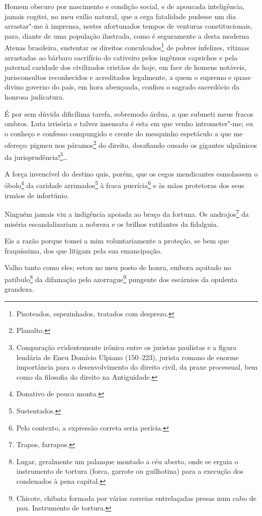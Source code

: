 Homem obscuro por nascimento e condição social, e de apoucada
inteligência, jamais cogitei, no meu exílio natural, que a cega
fatalidade pudesse um dia arrastar"-me à imprensa, nestes afortunados
tempos de venturas constitucionais, para, diante de uma população
ilustrada, como é seguramente a desta moderna Atenas brasileira,
sustentar os direitos conculcados\footnote{Pisoteados, espezinhados,
  tratados com desprezo.} de pobres infelizes, vítimas arrastadas ao
bárbaro sacrifício do cativeiro pelos ingênuos caprichos e pela paternal
caridade dos civilizados cristãos de hoje, em face de homens notáveis,
jurisconsultos reconhecidos e acreditados legalmente, a quem o supremo e
quase divino governo do país, em hora abençoada, confiou o sagrado
sacerdócio da honrosa judicatura.

É por sem dúvida dificílima tarefa, sobremodo árdua, a que submeti meus
fracos ombros. Luta irrisória e talvez insensata é esta em que venho
intrometer"-me; eu o conheço e confesso compungido e crente do mesquinho
espetáculo a que me ofereço: pigmeu nos páramos\footnote{Planalto.} do
direito, desafiando ousado os gigantes ulpiânicos da
jurisprudência!\footnote{Comparação evidentemente irônica entre os
  juristas paulistas e a figura lendária de Eneu Domício Ulpiano
  (150--223), jurista romano de enorme importância para o desenvolvimento
  do direito civil, da praxe processual, bem como da filosofia do
  direito na Antiguidade.}\ldots{}

A força invencível do destino quis, porém, que os cegos mendicantes
esmolassem o óbolo\footnote{Donativo de pouca monta.} da caridade
arrimados\footnote{Sustentados.} à fraca puerícia\footnote{Pelo
  contexto, a expressão correta seria perícia.} e às mãos protetoras dos
seus irmãos de infortúnio.

Ninguém jamais viu a indigência apoiada ao braço da fortuna. Os
andrajos\footnote{Trapos, farrapos.} da miséria escandalizariam a
nobreza e os brilhos rutilantes da fidalguia.

Eis a razão porque tomei a mim voluntariamente a proteção, se bem que
fraquíssima, dos que litigam pela sua emancipação.

Valho tanto como eles; estou no meu posto de honra, embora açoitado no
patíbulo\footnote{Lugar, geralmente um palanque montado a céu aberto,
  onde se erguia o instrumento de tortura (forca, garrote ou guilhotina)
  para a execução dos condenados à pena capital.} da difamação pelo
azorrague\footnote{Chicote, chibata formada por várias correias
  entrelaçadas presas num cabo de pau. Instrumento de tortura.} pungente
dos escárnios da opulenta grandeza.

